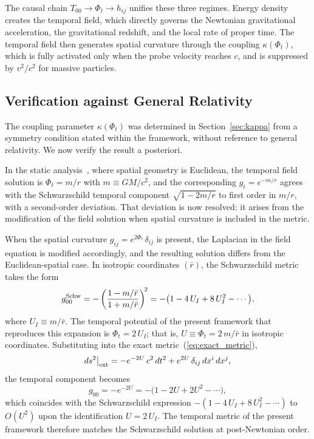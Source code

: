 \documentclass[12pt]{article}
\begin{document}
The causal chain $T_{00} \to \Phi_t \to h_{ij}$ unifies these three regimes. Energy density creates the temporal field, which directly governs the Newtonian gravitational acceleration, the gravitational redshift, and the local rate of proper time. The temporal field then generates spatial curvature through the coupling $\kappa(\Phi_t)$, which is fully activated only when the probe velocity reaches $c$, and is suppressed by $v^2/c^2$ for massive particles.

\subsection{Verification against General Relativity}
\label{sec:gr_verification}

The coupling parameter $\kappa(\Phi_t)$ was determined in Section~\ref{sec:kappa} from a symmetry condition stated within the framework, without reference to general relativity. We now verify the result a posteriori.

In the static analysis~\cite{Gwak2026a}, where spatial geometry is Euclidean, the temporal field solution is $\Phi_t = m/r$ with $m \equiv GM/c^2$, and the corresponding $g_t = e^{-m/r}$ agrees with the Schwarzschild temporal component $\sqrt{1-2m/r}$ to first order in $m/r$, with a second-order deviation. That deviation is now resolved: it arises from the modification of the field solution when spatial curvature is included in the metric.

When the spatial curvature $g_{ij} = e^{2\Phi_t}\,\delta_{ij}$ is present, the Laplacian in the field equation is modified accordingly, and the resulting solution differs from the Euclidean-spatial case. In isotropic coordinates $(\bar{r})$, the Schwarzschild metric takes the form $$ g_{00}^{\rm Schw} = -\left(\frac{1 - m/\bar{r}}{1 + m/\bar{r}}\right)^{\!2} = -\bigl(1 - 4\,U_I + 8\,U_I^2 - \cdots \bigr), $$ where $U_I \equiv m/\bar{r}$. The temporal potential of the present framework that reproduces this expansion is $\Phi_t = 2\,U_I$; that is, $U \equiv \Phi_t = 2\,m/\bar{r}$ in isotropic coordinates. Substituting into the exact metric~(\ref{eq:exact_metric}), $$ ds^2\big|_{\rm ext} = -e^{-2U}\,c^2\,dt^2 + e^{2U}\,\delta_{ij}\,dx^i\,dx^j, $$ the temporal component becomes $$ g_{00} = -e^{-2U} = -\bigl(1 - 2U + 2U^2 - \cdots \bigr), $$ which coincides with the Schwarzschild expression $-(1-4\,U_I+8\,U_I^2-\cdots)$ to $O(U^2)$ upon the identification $U = 2\,U_I$. The temporal metric of the present framework therefore matches the Schwarzschild solution at post-Newtonian order.
\end{document}
